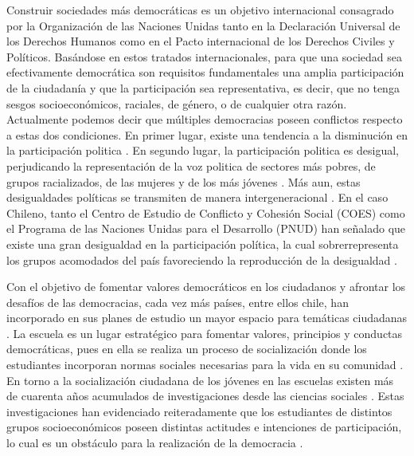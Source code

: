 \documentclass[12pt,twoside]{templates/facsothesis}
\begin{document}
Construir sociedades más democráticas es un objetivo internacional consagrado por la Organización de las Naciones Unidas tanto en la Declaración Universal de los Derechos Humanos como en el Pacto internacional de los Derechos Civiles y Políticos. Basándose en estos tratados internacionales, para que una sociedad sea efectivamente democrática son requisitos fundamentales una amplia participación de la ciudadanía y que la participación sea representativa, es decir, que no tenga sesgos socioeconómicos, raciales, de género, o de cualquier otra razón. Actualmente podemos decir que múltiples democracias poseen conflictos respecto a estas dos condiciones. En primer lugar, existe una tendencia a la disminución en la participación politica \citep{tezanos-pinto_Participacion_2015, herrmann_Disminucion_2016, diaz_Dimensiones_2017, janmaat_Civic_2013, contreras_DIFERENCIAS_2013, galston_Civic_2007}. En segundo lugar, la participación politica es desigual, perjudicando la representación de la voz politica de sectores más pobres, de grupos racializados, de las mujeres y de los más jóvenes \citep{verba_Would_2003, lijphart_Unequal_1997, desposato_Gender_2009, coffe_Explaining_2020, hutchings_CENTRALITY_2004}. Más aun, estas desigualdades políticas se transmiten de manera intergeneracional \citep{brady_Political_2015}. En el caso Chileno, tanto el Centro de Estudio de Conflicto y Cohesión Social (COES) como el Programa de las Naciones Unidas para el Desarrollo (PNUD) han señalado que existe una gran desigualdad en la participación política, la cual sobrerrepresenta los grupos acomodados del país favoreciendo la reproducción de la desigualdad \citep{joignant_Desigualdades_2017, palet_Desiguales_2017}.

Con el objetivo de fomentar valores democráticos en los ciudadanos y afrontar los desafíos de las democracias, cada vez más países, entre ellos chile, han incorporado en sus planes de estudio un mayor espacio para temáticas ciudadanas \citep{keer_ciudadania_2015}. La escuela es un lugar estratégico para fomentar valores, principios y conductas democráticas, pues en ella se realiza un proceso de socialización donde los estudiantes incorporan normas sociales necesarias para la vida en su comunidad \citep{durkheim_Educacion_2010}. En torno a la socialización ciudadana de los jóvenes en las escuelas existen más de cuarenta años acumulados de investigaciones desde las ciencias sociales \citep{torney_Crossnational_1979}. Estas investigaciones han evidenciado reiteradamente que los estudiantes de distintos grupos socioeconómicos poseen distintas actitudes e intenciones de participación, lo cual es un obstáculo para la realización de la democracia \citep{castillo_Social_2014, miranda_Political_2018, ferrans_Civic_2017, trevino_Influence_2017}.
\end{document}
